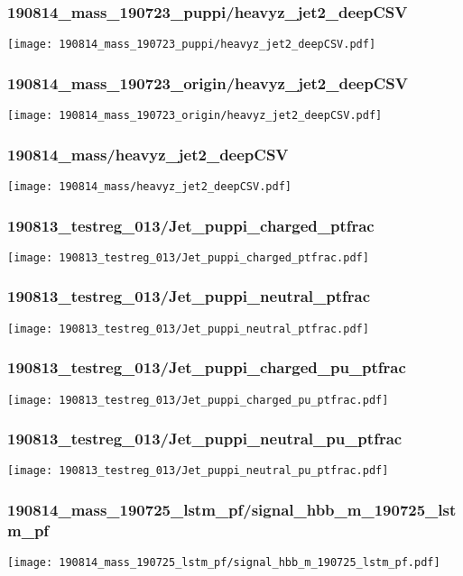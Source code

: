 \begin{frame}
   \frametitle{\small 190814\_mass\_190723\_puppi/heavyz\_jet2\_deepCSV}
   \centering
   \texttt{[image: 190814\_mass\_190723\_puppi/heavyz\_jet2\_deepCSV.pdf]}
\end{frame}

\begin{frame}
   \frametitle{\small 190814\_mass\_190723\_origin/heavyz\_jet2\_deepCSV}
   \centering
   \texttt{[image: 190814\_mass\_190723\_origin/heavyz\_jet2\_deepCSV.pdf]}
\end{frame}

\begin{frame}
   \frametitle{\small 190814\_mass/heavyz\_jet2\_deepCSV}
   \centering
   \texttt{[image: 190814\_mass/heavyz\_jet2\_deepCSV.pdf]}
\end{frame}

\begin{frame}
   \frametitle{\small 190813\_testreg\_013/Jet\_puppi\_charged\_ptfrac}
   \centering
   \texttt{[image: 190813\_testreg\_013/Jet\_puppi\_charged\_ptfrac.pdf]}
\end{frame}

\begin{frame}
   \frametitle{\small 190813\_testreg\_013/Jet\_puppi\_neutral\_ptfrac}
   \centering
   \texttt{[image: 190813\_testreg\_013/Jet\_puppi\_neutral\_ptfrac.pdf]}
\end{frame}

\begin{frame}
   \frametitle{\small 190813\_testreg\_013/Jet\_puppi\_charged\_pu\_ptfrac}
   \centering
   \texttt{[image: 190813\_testreg\_013/Jet\_puppi\_charged\_pu\_ptfrac.pdf]}
\end{frame}

\begin{frame}
   \frametitle{\small 190813\_testreg\_013/Jet\_puppi\_neutral\_pu\_ptfrac}
   \centering
   \texttt{[image: 190813\_testreg\_013/Jet\_puppi\_neutral\_pu\_ptfrac.pdf]}
\end{frame}

\begin{frame}
   \frametitle{\small 190814\_mass\_190725\_lstm\_pf/signal\_hbb\_m\_190725\_lstm\_pf}
   \centering
   \texttt{[image: 190814\_mass\_190725\_lstm\_pf/signal\_hbb\_m\_190725\_lstm\_pf.pdf]}
\end{frame}

